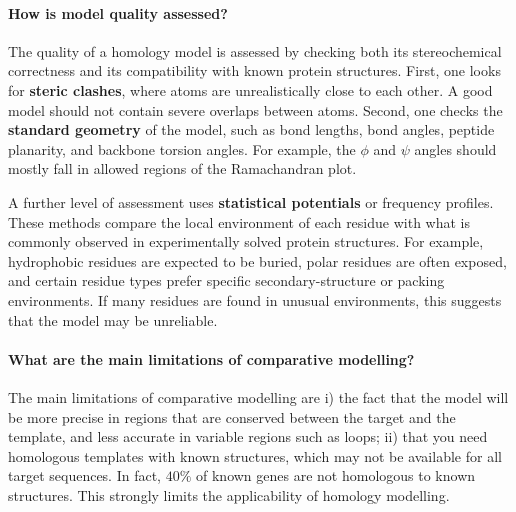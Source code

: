 \paragraph{How is model quality assessed?}
The quality of a homology model is assessed by checking both its stereochemical correctness and its compatibility with known protein structures. First, one looks for \textbf{steric clashes}, where atoms are unrealistically close to each other. A good model should not contain severe overlaps between atoms. Second, one checks the \textbf{standard geometry} of the model, such as bond lengths, bond angles, peptide planarity, and backbone torsion angles. For example, the $\phi$ and $\psi$ angles should mostly fall in allowed regions of the Ramachandran plot.

A further level of assessment uses \textbf{statistical potentials} or frequency profiles. These methods compare the local environment of each residue with what is commonly observed in experimentally solved protein structures. For example, hydrophobic residues are expected to be buried, polar residues are often exposed, and certain residue types prefer specific secondary-structure or packing environments. If many residues are found in unusual environments, this suggests that the model may be unreliable.


\paragraph{What are the main limitations of comparative modelling?}
The main limitations of comparative modelling are i) the fact that the model will be more precise in regions that are conserved between the target and the template, and less accurate in variable regions such as loops; ii) that
you need homologous templates with known structures, which may not be available for all target sequences. In fact, $40\%$ of known genes are not homologous to known structures. This strongly limits the applicability  of homology modelling.